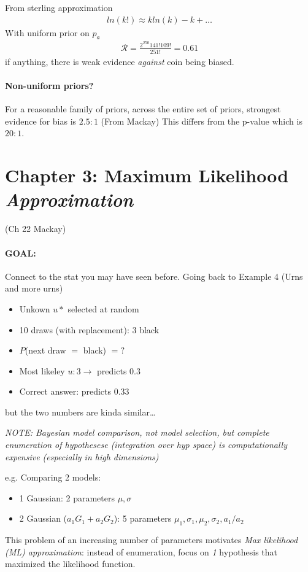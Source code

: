 \documentclass[../main.tex]{subfiles}
\begin{document}
From sterling approximation
\begin{align*}
    ln(k!) \approx k ln(k) - k + \dots
\end{align*}
With uniform prior on $p_a$
\begin{align*}
    \mathcal{R} = \frac{2^250 141! 109!}{251!} = 0.61
\end{align*}
if anything, there is weak evidence \emph{against} coin being biased.

\paragraph{Non-uniform priors?} For a reasonable family of priors, across the entire set of priors,
strongest evidence for bias is $2.5:1$ (From Mackay) This differs from the p-value which is $20:1$.

\section{Chapter 3: Maximum Likelihood \emph{Approximation}} (Ch 22 Mackay)

\paragraph{GOAL:} Connect to the stat you may have seen before. Going back to Example 4 (Urns and
more urns)

\begin{itemize}
    \item Unkown $u*$ selected at random
    \item 10 draws (with replacement): 3 black
    \item $P$(next draw $=$ black) $= ?$
    \item Most likeley $u: 3 \to$ predicts 0.3
    \item Correct answer: predicts 0.33
\end{itemize}
but the two numbers are kinda similar\dots 

\emph{NOTE: Bayesian model comparison, not model selection, but complete enumeration of
hypothesese (integration over hyp space) is computationally expensive (especially in high
dimensions)}

e.g. Comparing 2 models:
\begin{itemize}
    \item 1 Gaussian: 2 parameters $\mu, \sigma$
    \item 2 Gaussian ($a_1 G_1 + a_2 G_2$): 5 parameters $\mu_1, \sigma_1, \mu_2, \sigma_2, a_1/a_2$
\end{itemize}
This problem of an increasing number of parameters motivates \emph{Max likelihood (ML) 
approximation}: instead of enumeration, focus on \emph{1} hypothesis that maximized the likelihood
function.
\end{document}
